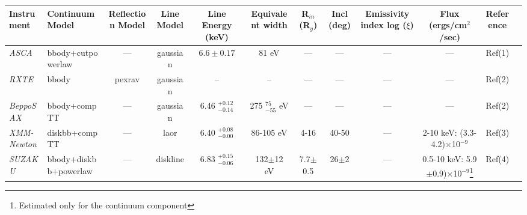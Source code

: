 \documentclass{aa}
\begin{document}


\begin{sidewaystable*}

\caption{Results of Spectral Analysis of Ser X-1 from Previous Studies \label{tab:intro}}             
  
  
    
\scriptsize


\begin{tabular}{llcccccccccc}     %
\hline\hline       

Instrument &
Continuum Model &
Reflection Model &
Line Model &
Line Energy (keV)&
Equivalent width &
R$_{in}$ (R$_{g}$) &
Incl (deg) &
Emissivity index log ($\xi$)&
Flux (ergs/cm$^{2}$/sec) &
Reference \\




\hline
\emph{ASCA}  & 
bbody+cutpowerlaw & 
--- &
gaussian &
$6.6 \pm 0.17$ &
81 eV &
--- &
--- &
--- &
--- &
Ref(1)  \\

\hline
 

\emph{RXTE}  & 
bbody & 
pexrav &
gaussian &
-- &
-- &
--- &
--- &
--- &
--- &
Ref(2) \\



\emph{BeppoSAX}  & 
bbody+compTT & 
--- &
gaussian &
6.46 $^{+0.12}_{-0.14}$  &
275 $^{75}_{-55}$ eV &
--- &
--- &
--- &
--- &
Ref(2) \\







\hline




\emph{XMM-Newton }  & 
diskbb+compTT & 
--- &
laor &
6.40 $^{+0.08}_{-0.00}$  &
86-105 eV &
4-16  &
40-50  &
--- &
2-10 keV: (3.3-4.2)$\times$10${^{-9}}$ &
Ref(3) \\

\hline



\emph{SUZAKU}  & 
bbody+diskbb+powerlaw & 
--- &
diskline &
6.83 $^{+0.15}_{-0.06}$  &
132$\pm$12 eV &
7.7$\pm$0.5 &
26$\pm$2 &
--- &
0.5-10 keV: 5.9$\pm$0.9)$\times$10${^{-9}}$\footnote{Estimated only for the continuum component} &
Ref(4) \\


\end{tabular}
\end{sidewaystable*}
\end{document}
